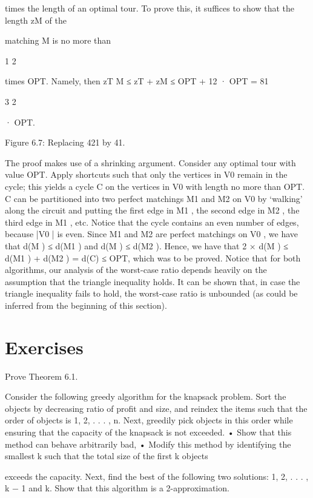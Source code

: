 times the length of an optimal tour. To prove this, it suffices to show that the length zM of the

matching M is no more than

1
2

times OPT. Namely, then zT M ≤ zT + zM ≤ OPT + 12 · OPT =
81

3
2

· OPT.

Figure 6.7: Replacing 421 by 41.

The proof makes use of a shrinking argument. Consider any optimal tour with value OPT. Apply
shortcuts such that only the vertices in V0 remain in the cycle; this yields a cycle C on the vertices in
V0 with length no more than OPT. C can be partitioned into two perfect matchings M1 and M2 on V0
by ‘walking' along the circuit and putting the first edge in M1 , the second edge in M2 , the third edge in
M1 , etc. Notice that the cycle contains an even number of edges, because |V0 | is even.
Since M1 and M2 are perfect matchings on V0 , we have that d(M ) ≤ d(M1 ) and d(M ) ≤ d(M2 ). Hence,
we have that 2 × d(M ) ≤ d(M1 ) + d(M2 ) = d(C) ≤ OPT, which was to be proved.
Notice that for both algorithms, our analysis of the worst-case ratio depends heavily on the assumption
that the triangle inequality holds. It can be shown that, in case the triangle inequality fails to hold, the
worst-case ratio is unbounded (as could be inferred from the beginning of this section).

\section*{Exercises}
\begin{exercise}
Prove Theorem 6.1.
\end{exercise}

\begin{exercise}
Consider the following greedy algorithm for the knapsack problem. Sort the objects by decreasing ratio
of profit and size, and reindex the items such that the order of objects is 1, 2, . . . , n. Next, greedily pick
objects in this order while ensuring that the capacity of the knapsack is not exceeded.
• Show that this method can behave arbitrarily bad,
• Modify this method by identifying the smallest k such that the total size of the first k objects

exceeds the capacity. Next, find the best of the following two solutions: {1, 2, . . . , k − 1} and {k}.
Show that this algorithm is a 2-approximation.
\end{exercise}

